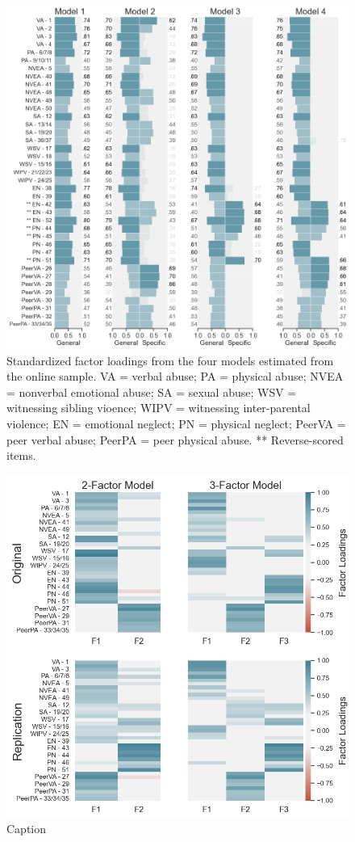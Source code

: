 \documentclass[letterpaper,man,natbib]{apa6}  %
\begin{document}
\begin{figure}
    \centering
    \includegraphics[width=1.1\textwidth,center]{figures/fig02.png}
    \caption{Standardized factor loadings from the four models estimated from the online sample. VA = verbal abuse; PA = physical abuse; NVEA = nonverbal emotional abuse; SA = sexual abuse; WSV = witnessing sibling vioence; WIPV = witnessing inter-parental violence; EN = emotional neglect; PN = physical neglect; PeerVA = peer verbal abuse; PeerPA = peer physical abuse. ** Reverse-scored items.}
    \label{fig:loadings_online}
\end{figure}

\begin{figure}
    \centering
    \includegraphics[width=1\textwidth,center]{figures/fig03.png}
    \caption{Caption}
    \label{fig:efa}
\end{figure}
\end{document}
